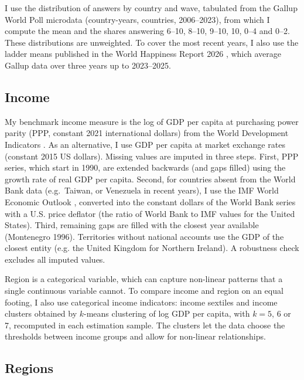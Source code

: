 \documentclass[12pt]{article}
\begin{document}
I use the distribution of answers by country and wave, tabulated from the Gallup World Poll microdata (\nGallupCountryYears country-years, \nGallupCountries countries, 2006--2023), from which I compute the mean and the shares answering 6--10, 8--10, 9--10, 10, 0--4 and 0--2. These distributions are unweighted. To cover the most recent years, I also use the ladder means published in the World Happiness Report 2026 \citep{whr_2026}, which average Gallup data over three years up to 2023--2025.

\subsection{Income}\label{subsec:income}

My benchmark income measure is the log of GDP per capita at purchasing power parity (PPP, constant 2021 international dollars) from the World Development Indicators \citep{worldbank_wdi_2026}. As an alternative, I use GDP per capita at market exchange rates (constant 2015 US dollars). Missing values are imputed in three steps. First, PPP series, which start in 1990, are extended backwards (and gaps filled) using the growth rate of real GDP per capita. Second, for countries absent from the World Bank data (e.g.\ Taiwan, or Venezuela in recent years), I use the IMF World Economic Outlook \citep{imf_weo_2026}, converted into the constant dollars of the World Bank series with a U.S. price deflator (the ratio of World Bank to IMF values for the United States). Third, remaining gaps are filled with the closest year available (Montenegro 1996). Territories without national accounts use the GDP of the closest entity (e.g. the United Kingdom for Northern Ireland). A robustness check excludes all imputed values.

\ifshowregion
Region is a categorical variable, which can capture non-linear patterns that a single continuous variable cannot. To compare income and region on an equal footing, I also use categorical income indicators: income sextiles and income clusters obtained by $k$-means clustering of log GDP per capita, with $k = 5$, 6 or 7, recomputed in each estimation sample. The clusters let the data choose the thresholds between income groups and allow for non-linear relationships.
\fi

\ifshowregion
\subsection{Regions}\label{subsec:regions}
\end{document}
